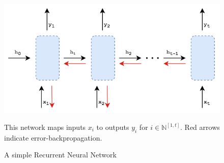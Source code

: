 \documentclass{report}
\begin{document}
\begin{figure}[h]
 \centering
 \includegraphics[width=12cm]{rnn}
 \caption{A simple Recurrent Neural Network}
 \label{fig:rnn:1}
 This network maps inputs $x_i$ to outputs $y_i$ for $i \in \mathbb{N}^{[1, t]}$. Red arrows indicate error-backpropagation.
\end{figure}
\end{document}
